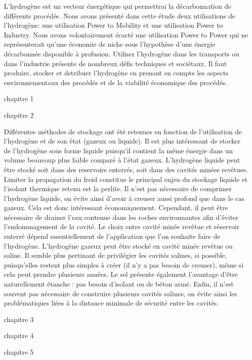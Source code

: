 \documentclass[11pt,french,a4paper]{article}
\begin{document}
L'hydrogène est un vecteur énergétique qui permettrai la décarbonnation de différents procédés. Nous avons présenté dans cette étude deux utilisations de l'hydrogène: une utilisation Power to Mobility
et une utilisation Power to Industry. Nous avons volontairement écarté une utilisation Power to Power qui ne représenterait qu'une économie de niche sous l'hypothèse d'une énergie décarbonnée disponible à profusion. Utiliser l'hydrogène dans les transports ou dans l'industrie présente de nombreux défis techniques et sociétaux. 
Il faut produire, stocker et dstribuer l'hydrogène en prenant en compte les aspects environnementaux des procédés et de la viabilité économique des procédés. 

chapitre 1

chapitre 2

Différentes méthodes de stockage  ont été retenues en fonction de l'utilisation de l'hydrogène et de son état (gazeux ou liquide). 
Il est plus intéressant de stocker de l'hydrogène sous forme liquide puisqu'il contient la même énergie dans un volume beaucoup plus faible comparé à l'état gazeux. 
L'hydrogène liquide peut être stocké soit dans des reservoirs enterrés, soit dans des cavités minées revêtues. Limiter la propagation du froid constitue le principal enjeu du stockage liquide et l'isolant thermique retenu est la perlite. Il n'est pas nécessaire  de comprimer l'hydrogène liquide, on évite ainsi d'avoir à creuser aussi profond que dans le cas gazeux. Cela est donc intéressant économiquement. Cependant, il peut être nécessaire de drainer l'eau contenue dans les roches environnantes afin d'éviter l'endommagement de la cavité. Le choix entre cavité minée revêtue et réservoir enterré dépend essentiellement de l'application que l'on souhaite faire de l'hydrogène.
L'hydrogène gazeux peut être stocké en cavité minée revêtue ou saline. Il semble plus pertinant de privilégier les cavités salines, si possible, puisqu'elles restent plus simples à créer (il n'y a pas besoin de creuser), même si cela peut prendre plusieurs années. Le sel présente également l'avantage d'être naturellement étanche : pas besoin d'isolant ou de béton armé. Enfin, il n'est souvent pas nécessaire de construire plusieurs cavités salines, on évite ainsi les problématiques liées à la distance minimale de sécurité entre les cavités.

chapitre 3

chapitre 4

chapitre 5
\end{document}
